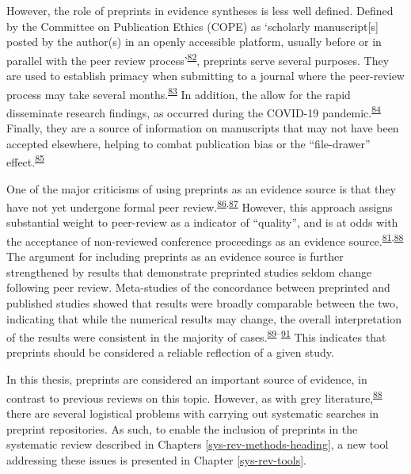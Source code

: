 \documentclass[a4paper, twoside]{templates/ociamthesis}
\begin{document}
However, the role of preprints in evidence syntheses is less well defined. Defined by the Committee on Publication Ethics (COPE) as `scholarly manuscript{[}s{]} posted by the author(s) in an openly accessible platform, usually before or in parallel with the peer review process'\textsuperscript{\protect\hyperlink{ref-committeeonpublicationethicscope2018}{82}}, preprints serve several purposes. They are used to establish primacy when submitting to a journal where the peer-review process may take several months.\textsuperscript{\protect\hyperlink{ref-vale2016}{83}} In addition, the allow for the rapid disseminate research findings, as occurred during the COVID-19 pandemic.\textsuperscript{\protect\hyperlink{ref-fraser2020preprinting}{84}} Finally, they are a source of information on manuscripts that may not have been accepted elsewhere, helping to combat publication bias or the ``file-drawer'' effect.\textsuperscript{\protect\hyperlink{ref-rosenthal1979}{85}}

One of the major criticisms of using preprints as an evidence source is that they have not yet undergone formal peer review.\textsuperscript{\protect\hyperlink{ref-maslove2018}{86},\protect\hyperlink{ref-schalkwyk2020}{87}} However, this approach assigns substantial weight to peer-review as a indicator of ``quality'', and is at odds with the acceptance of non-reviewed conference proceedings as an evidence source.\textsuperscript{\protect\hyperlink{ref-lefebvre2019searching}{81},\protect\hyperlink{ref-mahood2014}{88}} The argument for including preprints as an evidence source is further strengthened by results that demonstrate preprinted studies seldom change following peer review. Meta-studies of the concordance between preprinted and published studies showed that results were broadly comparable between the two, indicating that while the numerical results may change, the overall interpretation of the results were consistent in the majority of cases.\textsuperscript{\protect\hyperlink{ref-shi2021}{89}--\protect\hyperlink{ref-nicholson2021}{91}} This indicates that preprints should be considered a reliable reflection of a given study.

In this thesis, preprints are considered an important source of evidence, in contrast to previous reviews on this topic. However, as with grey literature,\textsuperscript{\protect\hyperlink{ref-mahood2014}{88}} there are several logistical problems with carrying out systematic searches in preprint repositories. As such, to enable the inclusion of preprints in the systematic review described in Chapters \ref{sys-rev-methods-heading}, a new tool addressing these issues is presented in Chapter \ref{sys-rev-tools}.
\end{document}
